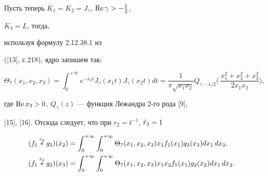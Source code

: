 \begin{exam}


Пусть теперь $K_1=K_2=J_\gamma$, $\operatorname{Re}\gamma>-\frac{1}{2}$,


$K_3=L$, тогда,


используя формулу 2.12.38.1 из


([13], с.218), ядро запишем так:


$$


\Theta_7(x_1,x_2,x_3)=\int^{+\infty}_0


e^{-x_3t}J_\gamma(x_1t)J_\gamma(x_2t)dt=


\frac{1}{\pi\sqrt{x_1x_2}}Q_{\gamma-1/2}\biggl(\,


\frac{x^2_1+x^2_2+x^2_3}{2x_1x_2}\biggr),


$$


где $\operatorname{Re} x_3>0$, $Q_\gamma(z)$ --- функция Лежандра 2-го рода [9],


[15], [16]. Отсюда следует, что при $r_2=t^{-1}$, $\Bar r_3=1$


\begin{align*}


(f_1\up{r_2}{}g_3)(x_2)&=\int^{+\infty}_0 \int^{+\infty}_0


\Theta_7(x_1,x_2,x_3)x_1f_1(x_1)g_3(x_3)dx_1\,dx_3,\\


(f_1\up{\Bar r_3}{}g_2)(x_3)&=\int^{+\infty}_0 \int^{+\infty}_0


\Theta_7(x_1,x_2,x_3)x_1x_2f_1(x_1)g_2(x_2)dx_1\,dx_2.


\end{align*}


\end{exam}





